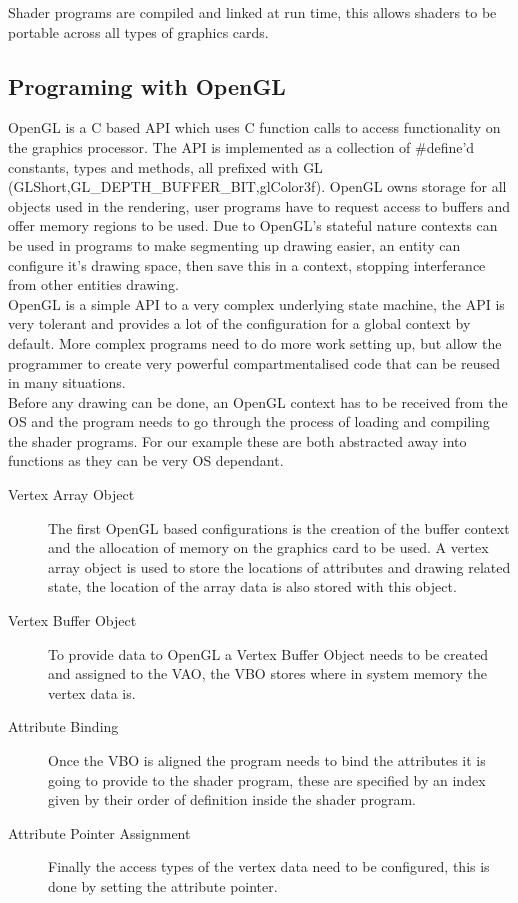 Shader programs are compiled and linked at run time, this allows shaders to be 
portable across all types of graphics cards.\\

\subsection{Programing with OpenGL}
OpenGL is a C based API which uses C function calls to access functionality on 
the graphics processor. The API is implemented as a collection of \#define'd 
constants, types and methods, all prefixed with GL 
(GLShort,GL\_DEPTH\_BUFFER\_BIT,glColor3f). OpenGL owns storage for all objects
used in the rendering, user programs have to request access to buffers and offer
memory regions to be used. Due to OpenGL's stateful nature contexts can be used 
in programs to make segmenting up drawing easier, an entity can configure it's 
drawing space, then save this in a context, stopping interferance from other 
entities drawing. \\

OpenGL is a simple API to a very complex underlying state machine, the API is 
very tolerant and provides a lot of the configuration for a global context by 
default. More complex programs need to do more work setting up, but allow the
programmer to create very powerful compartmentalised code that can be reused in 
many situations.\\

Before any drawing can be done, an OpenGL context has to be received from the OS
and the program needs to go through the process of loading and compiling the 
shader programs. For our example these are both abstracted away into functions as
they can be very OS dependant.  \\

\begin{description}
\item[Vertex Array Object] The first OpenGL based configurations is the 
creation of the buffer context and the allocation of memory on the graphics card
to be used. A vertex array object is used to store the locations of attributes 
and drawing related state, the location of the array data is also stored with
this object.
\item[Vertex Buffer Object]
To provide data to OpenGL a Vertex Buffer Object needs to be created
and assigned to the VAO, the VBO stores where in system memory the vertex data 
is. 
\item[Attribute Binding]
Once the VBO is aligned the program needs to bind the attributes it is going
to provide to the shader program, these are specified by an index given by their
order of definition inside the shader program.
\item[Attribute Pointer Assignment]
Finally the access types of the 
vertex data need to be configured, this is done by setting the attribute 
pointer. 
\end{description}

